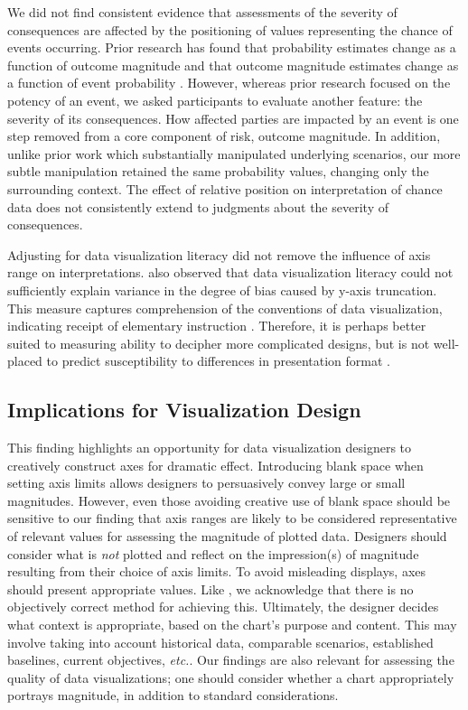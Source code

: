 \documentclass[journal]{vgtc}                %
\begin{document}
We did not find consistent evidence that assessments of the severity of
consequences are affected by the positioning of values representing the
chance of events occurring. Prior research has found that probability
estimates change as a function of outcome magnitude
\citep{harris_communicating_2011, harris_estimating_2009} and that outcome
magnitude estimates change as a function of event probability
\citep{kupor_probable_2020}. However, whereas prior research focused on the
potency of an event, we asked participants to evaluate another feature:
the severity of its consequences. How affected parties are impacted by
an event is one step removed from a core component of risk, outcome
magnitude. In addition, unlike prior work which substantially
manipulated underlying scenarios, our more subtle manipulation retained
the same probability values, changing only the surrounding context. The
effect of relative position on interpretation of chance data does not
consistently extend to judgments about the severity of consequences.

Adjusting for data visualization literacy did not remove the influence
of axis range on interpretations. \citet{yang_truncating_2021} also observed
that data visualization literacy could not sufficiently explain variance
in the degree of bias caused by y-axis truncation. This measure captures
comprehension of the conventions of data visualization, indicating
receipt of elementary instruction \citep{okan_how_2016}. Therefore, it is
perhaps better suited to measuring ability to decipher more complicated
designs, but is not well-placed to predict susceptibility to differences
in presentation format \citep{yang_truncating_2021}.

\hypertarget{implications-for-visualization-design}{%
\subsection{Implications for Visualization Design}\label{implications-for-visualization-design}}

This finding highlights an opportunity for data visualization designers
to creatively construct axes for dramatic effect. Introducing blank
space when setting axis limits allows designers to persuasively convey
large or small magnitudes. However, even those avoiding creative use of
blank space should be sensitive to our finding that axis ranges are
likely to be considered representative of relevant values for assessing
the magnitude of plotted data. Designers should consider what is \emph{not}
plotted and reflect on the impression(s) of magnitude resulting from
their choice of axis limits. To avoid misleading displays, axes should
present appropriate values. Like \citet{correll_truncating_2020}, we
acknowledge that there is no objectively correct method for achieving
this. Ultimately, the designer decides what context is appropriate,
based on the chart's purpose and content. This may involve taking into
account historical data, comparable scenarios, established baselines,
current objectives, \emph{etc.}. Our findings are also relevant for assessing
the quality of data visualizations; one should consider whether a chart
appropriately portrays magnitude, in addition to standard
considerations.
\end{document}
